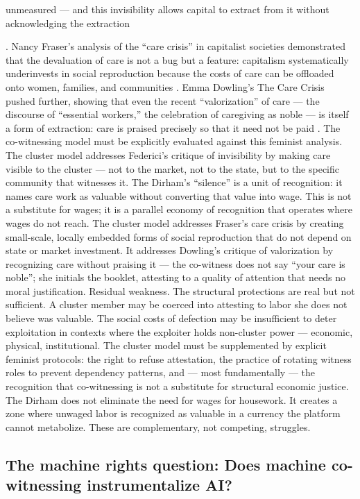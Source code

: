 unmeasured — and this invisibility allows capital to extract from it without acknowledging the extraction

\cite{federici_1975}. Nancy Fraser’s analysis of the “care crisis” in capitalist societies demonstrated that the devaluation of care is not a bug but a feature: capitalism systematically underinvests in social reproduction because the costs of care can be offloaded onto women, families, and communities \cite{fraser_2016}. Emma Dowling’s The Care Crisis pushed further, showing that even the recent “valorization” of care — the discourse of “essential workers,” the celebration of caregiving as noble — is itself a form of extraction: care is praised precisely so that it need not be paid \cite{dowling_2021}. The co-witnessing model must be explicitly evaluated against this feminist analysis. The cluster model addresses Federici’s critique of invisibility by making care visible to the cluster — not to the market, not to the state, but to the specific community that witnesses it. The Dirham’s “silence” is a unit of recognition: it names care work as valuable without converting that value into wage. This is not a substitute for wages; it is a parallel economy of recognition that operates where wages do not reach. The cluster model addresses Fraser’s care crisis by creating small-scale, locally embedded forms of social reproduction that do not depend on state or market investment. It addresses Dowling’s critique of valorization by recognizing care without praising it — the co-witness does not say “your care is noble”; she initials the booklet, attesting to a quality of attention that needs no moral justification. Residual weakness. The structural protections are real but not sufficient. A cluster member may be coerced into attesting to labor she does not believe was valuable. The social costs of defection may be insufficient to deter exploitation in contexts where the exploiter holds non-cluster power — economic, physical, institutional. The cluster model must be supplemented by explicit feminist protocols: the right to refuse attestation, the practice of rotating witness roles to prevent dependency patterns, and — most fundamentally — the recognition that co-witnessing is not a substitute for structural economic justice. The Dirham does not eliminate the need for wages for housework. It creates a zone where unwaged labor is recognized as valuable in a currency the platform cannot metabolize. These are complementary, not competing, struggles.

\subsection{The machine rights question: Does machine co-witnessing instrumentalize AI?}

